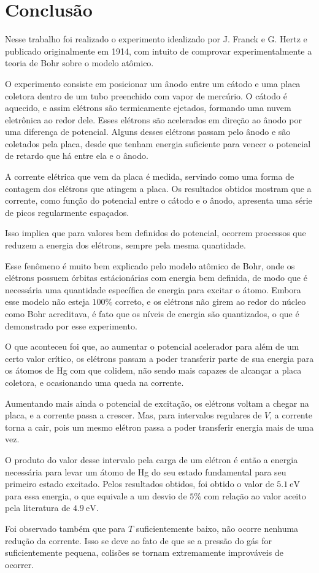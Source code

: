 \section{Conclusão}

Nesse trabalho foi realizado o experimento idealizado por J. Franck e G. Hertz e publicado originalmente em
1914, com intuito de comprovar experimentalmente a teoria de Bohr sobre o modelo atômico. 

O experimento consiste em posicionar um ânodo entre um cátodo e uma placa coletora dentro de um tubo preenchido com 
vapor de mercúrio. 
O cátodo é aquecido, e assim elétrons são termicamente ejetados, formando uma nuvem eletrônica ao redor dele.
Esses elétrons são acelerados em direção ao ânodo por uma diferença de potencial. 
Alguns desses elétrons passam pelo ânodo e são coletados pela placa, desde que tenham energia suficiente para vencer
o potencial de retardo que há entre ela e o ânodo.

A corrente elétrica que vem da placa é medida, servindo como uma forma de contagem dos elétrons que atingem a placa.
Os resultados obtidos mostram que a corrente, como função do potencial entre o cátodo e o ânodo, apresenta uma série de 
picos regularmente espaçados. 

Isso implica que para valores bem definidos do potencial, ocorrem processos que reduzem a energia dos elétrons, sempre
pela mesma quantidade.

Esse fenômeno é muito bem explicado pelo modelo atômico de Bohr, onde os elétrons possuem órbitas estácionárias 
com energia bem definida, de modo que é necessária uma quantidade específica de energia para excitar o átomo. 
Embora esse modelo não esteja $100\%$ correto, e os elétrons não girem ao redor do núcleo como Bohr acreditava, é fato 
que os níveis de energia são quantizados, o que é demonstrado por esse experimento.

O que aconteceu foi que, ao aumentar o potencial acelerador para além de um certo valor crítico, 
os elétrons passam a poder transferir parte de sua energia para os átomos de Hg com que colidem, não sendo mais 
capazes de alcançar a placa coletora, e ocasionando uma queda na corrente.

Aumentando mais ainda o potencial de excitação, os elétrons voltam a chegar na placa, e a corrente passa a crescer.
Mas, para intervalos regulares de $V$, a corrente torna a cair, pois um mesmo elétron passa a poder transferir energia
mais de uma vez.
 
O produto do valor desse intervalo pela carga de um elétron é então a energia necessária para levar um átomo de Hg do seu estado fundamental para seu primeiro estado excitado. 
Pelos resultados obtidos, foi obtido o valor de $\qty{5,1}{\eV}$ para essa energia, o que equivale a um desvio de $5\%$ com relação ao valor aceito pela literatura de $\qty{4,9}{\eV}$.

Foi observado também que para $T$ suficientemente baixo, não ocorre nenhuma redução da corrente. 
Isso se deve ao fato de que se a pressão do gás for suficientemente pequena, colisões se tornam extremamente 
improváveis de ocorrer. 